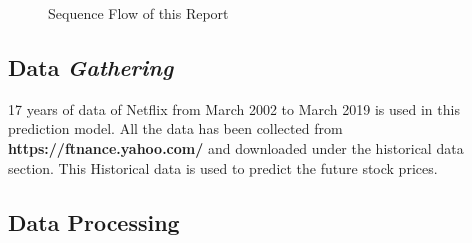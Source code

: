 \documentclass[5p,,preprint,12pt,twocolumn]{elsarticle}
\makeatletter
\def\fixFloatSize#1{}%
\makeatother
\begin{document}
\bgroup
\fixFloatSize{images/58df7fa7-775c-46ad-92de-4cd885d85079-uscreenshot-439.png}
\begin{figure}[!htbp]
\centering \makeatletter{}
\makeatother 
\caption{{Sequence Flow of this Report}}
\label{f-f7cf5339f33d}
\end{figure}
\egroup




\subsection{Data \textit{Gathering}}17 years of data of Netflix from March 2002 to March 2019 is used in this prediction model. All the data has been collected from \textbf{https://ftnance.yahoo.com/ }and downloaded under the historical data section. This Historical data is used to predict the future stock prices.



\subsection{Data Processing}
\end{document}

